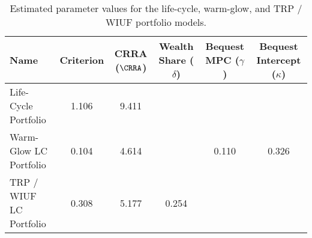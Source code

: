 \begin{table}\centering
    \begin{tabular}{lccccc}
        \toprule
        Name                   & Criterion & CRRA ($\CRRA $) & Wealth Share ($\delta $) & Bequest MPC ($ \gamma $) & Bequest Intercept ($ \kappa $) \\
        \midrule
        Life-Cycle Portfolio   & 1.106     & 9.411          &                         &                           &                                 \\
        Warm-Glow LC Portfolio & 0.104     & 4.614          &                         & 0.110                     & 0.326                          \\
        TRP / WIUF LC Portfolio       & 0.308     & 5.177          & 0.254                   &                           &                                 \\
        \bottomrule
    \end{tabular}
    \caption{Estimated parameter values for the life-cycle, warm-glow, and TRP / WIUF portfolio models.}
    \label{parameters}
\end{table}
